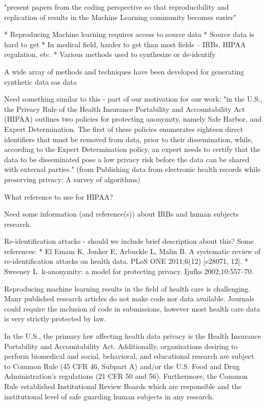 "present papers from the coding perspective so that reproducibility and replication of results in the Machine Learning community becomes easier"

* Reproducing Machine learning requires access to source data
* Source data is hard to get
* In medical field, harder to get than most fields – IRBs, HIPAA regulation, etc.
* Various methods used to synthesize or de-identify

A wide array of methods and techniques have been developed for generating synthetic data sas  data \cite{walonoski_synthea:_2018}

Need something similar to this - part of our motivation for our work:
"in the U.S., the Privacy Rule of the Health Insurance Portability and Accountability Act (HIPAA)  outlines two policies for protecting anonymity, namely Safe Harbor, and Expert Determination. The first of these policies enumerates eighteen direct identifiers that must be removed from data, prior to their dissemination, while, according to the Expert Determination policy, an expert needs to certify that the data to be disseminated pose a low privacy risk before the data can be shared with external parties." (from Publishing data from electronic health records while preserving privacy: A survey of algorithms)

What reference to use for HIPAA? \cite{hippapro}

Need some information (and reference(s)) about IRBs and human subjects research. 

Re-identification attacks - should we include brief description about this? Some references: 
* El Emam K, Jonker E, Arbuckle L, Malin B. A systematic review of re-identification attacks on health data. PLoS ONE 2011;6(12) [e28071, 12].
* Sweeney L. k-anonymity: a model for protecting privacy. Ijufks 2002;10:557–70.

Reproducing machine learning results in the field of health care is challenging. Many published research articles do not make code nor data available. Journals could require the inclusion of code in submissions, however most health care data is very strictly protected by law.

 In the U.S., the primary law affecting health data privacy is the Health Insurance Portability and Accountability Act. Additionally, organizations desiring to perform biomedical and social, behavioral, and educational research are subject to Common Rule (45 CFR 46, Subpart A) and/or the U.S. Food and Drug Administration’s regulations (21 CFR 50 and 56). Furthermore, the Common Rule established Institutional Review Boards which are responsible and the institutional level of safe guarding human subjects in any research. 

